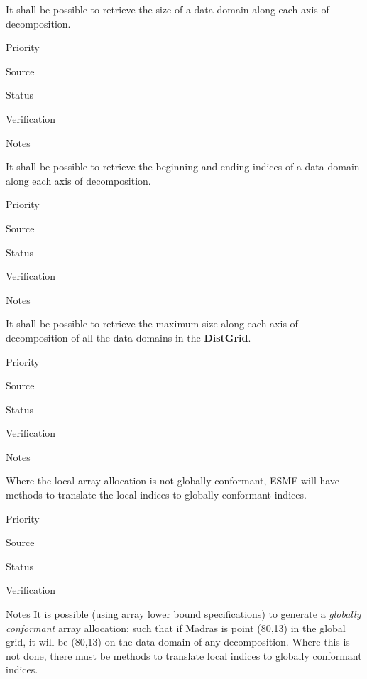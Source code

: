 

It shall be possible to retrieve the size of a data domain
along each axis of decomposition.

\begin{reqlist}
\item[Priority]
\item[Source]
\item[Status]
\item[Verification]
\item[Notes]
\end{reqlist}


It shall be possible to retrieve the beginning and ending indices of a
data domain along each axis of decomposition.

\begin{reqlist}
\item[Priority]
\item[Source]
\item[Status]
\item[Verification]
\item[Notes]
\end{reqlist}


It shall be possible to retrieve the maximum size along each axis of
decomposition of all the data domains in the \textbf{DistGrid}. 

\begin{reqlist}
\item[Priority]
\item[Source]
\item[Status]
\item[Verification]
\item[Notes]
\end{reqlist}


Where the local array allocation is not globally-conformant, 
ESMF will have methods to translate the local indices to
globally-conformant indices.

\begin{reqlist}
\item[Priority]
\item[Source]
\item[Status]
\item[Verification]
\item[Notes] It is possible (using array lower bound specifications)
  to generate a \emph{globally conformant} array allocation: such that
  if Madras is point (80,13) in the global grid, it will be (80,13) on
  the data domain of any decomposition. Where this is not done, there
  must be methods to translate local indices to globally conformant
  indices.
\end{reqlist}

